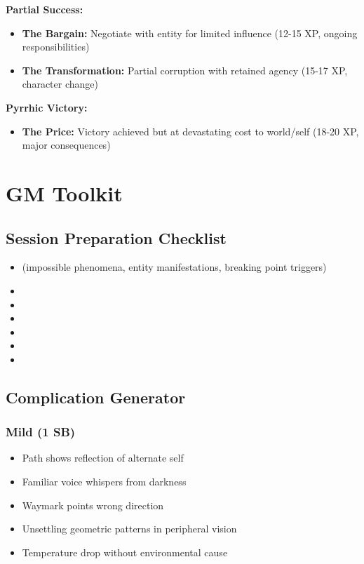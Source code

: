 \documentclass[11pt]{article}
\begin{document}
\textbf{Partial Success:}
\begin{itemize}
\item \textbf{The Bargain:} Negotiate with entity for limited influence (12-15 XP, ongoing responsibilities)
\item \textbf{The Transformation:} Partial corruption with retained agency (15-17 XP, character change)
\end{itemize}

\textbf{Pyrrhic Victory:}
\begin{itemize}
\item \textbf{The Price:} Victory achieved but at devastating cost to world/self (18-20 XP, major consequences)
\end{itemize}

\section{GM Toolkit}

\subsection{Session Preparation Checklist}

\begin{itemize}
\item {} (impossible phenomena, entity manifestations, breaking point triggers)
\item {}
\item {}
\item {}
\item {}
\item {}
\item {}
\end{itemize}

\subsection{Complication Generator}

\subsubsection{Mild (1 SB)}
\begin{itemize}
\item Path shows reflection of alternate self
\item Familiar voice whispers from darkness
\item Waymark points wrong direction
\item Unsettling geometric patterns in peripheral vision
\item Temperature drop without environmental cause
\end{itemize}
\end{document}
